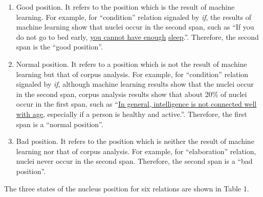 \documentclass[english]{jnlp_1.2.0}
\begin{document}
\begin{enumerate}
   \item Good position. It refers to the position which is the result
   of machine learning. For example, for ``condition'' relation signaled 
   by \textit{if}, the results of machine learning show that nuclei occur 
   in the second span, such as ``If you do not go to bed early, 
    \underline{you cannot have enough} \linebreak\underline{sleep}.''. 
   Therefore, the second span 
   is the ``good position''. 
   \item Normal position. It refers to a position which is not the result 
   of machine learning but that of corpus analysis. For example, 
   for ``condition'' relation signaled by \textit{if}, although machine 
   learning results show that the nuclei occur in the second span, 
   corpus analysis results show that about 20\% of nuclei occur in the first 
   span, such as ``\underline{In general, intelligence is not connected well with age},
   especially if a person is healthy and active.''.
   Therefore, the first span is a ``normal position''.
   \item Bad position. It refers to the position which is neither the
   result of machine learning nor that of corpus analysis. 
   For example, for ``elaboration'' relation, nuclei never occur in the 
   second span. Therefore, the second span is a ``bad position''.
\end{enumerate}

The three states of the nucleus position for six relations are shown in Table 1. 
\end{document}

